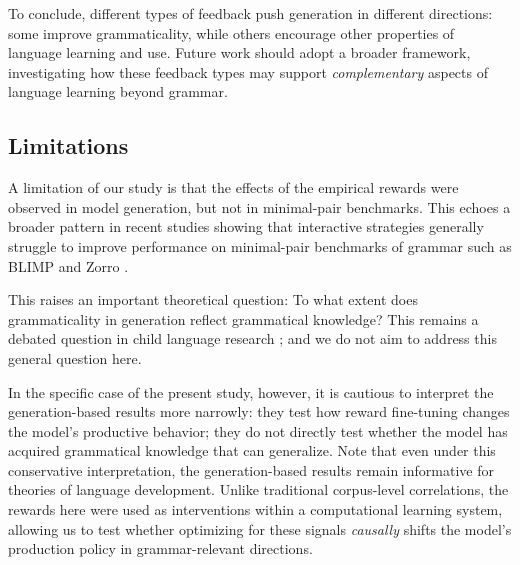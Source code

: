 To conclude, different types of feedback push generation in different directions: some improve grammaticality, while others encourage other properties of language learning and use. 
Future work should adopt a broader framework, investigating how these feedback types may support \textit{complementary} aspects of language learning beyond grammar.

\subsection*{Limitations}

A limitation of our study is that the effects of the empirical rewards were observed in model generation, but not in minimal-pair benchmarks. This echoes a broader pattern in recent studies showing that interactive strategies generally struggle to improve performance on minimal-pair benchmarks of grammar such as BLIMP and Zorro \cite{zhao-etal-2023-babystories, padovani2025dialogue, nikolaus_fourtassi_2026, stopler2025towards}.

This raises an important theoretical question: To what extent does grammaticality in generation reflect grammatical knowledge? 
This remains a debated question in child language research \cite{ambridge2011child, chater2018language};
and we do not aim to address this general question here.


In the specific case of the present study, however, it is cautious to interpret the generation-based results more narrowly: they test how reward fine-tuning changes the model’s productive behavior; they do not directly test whether the model has acquired grammatical knowledge that can generalize. 
Note that even under this conservative interpretation, the generation-based results remain informative for theories of language development. Unlike traditional corpus-level correlations, the rewards here were used as interventions within a computational learning system, allowing us to test whether optimizing for these signals \textit{causally} shifts the model’s production policy in grammar-relevant directions.

